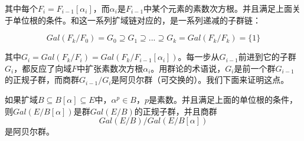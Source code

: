 \documentclass{article}
\begin{document}
其中每个$F_i = F_{i-1}[\alpha_i]$，而$\alpha_i$是$F_{i-1}$中某个元素的素数次方根。并且满足上面关于单位根的条件。和这一系列扩域链对应的，是一系列递减的子群链：

\[
Gal(F_k/F_0) = G_0 \supseteq G_1 \supseteq ... \supseteq G_k = Gal(F_k/F_k) = \{1\}
\]

其中$G_i = Gal(F_k/F_i) = Gal(F_k/F_{i-1}[\alpha_i])$。每一步从$G_{i-1}$前进到它的子群$G_i$，都反应了向域$F$中扩张素数次方根$\alpha_i$。用群论的术语说，$G_i$是前一个群$G_{i-1}$的正规子群，而商群$G_{i-1}/G_i$是阿贝尔群（可交换的）。我们下面来证明这点。

\begin{theorem}
如果扩域$B \subseteq B[\alpha] \subseteq E$中，$\alpha^p \in B$，$p$是素数。并且满足上面的单位根的条件，则$Gal(E/B[\alpha])$是群$Gal(E/B)$的正规子群，并且商群
\[
Gal(E/B) / Gal(E/B[\alpha])
\]
是阿贝尔群。
\end{theorem}
\end{document}
